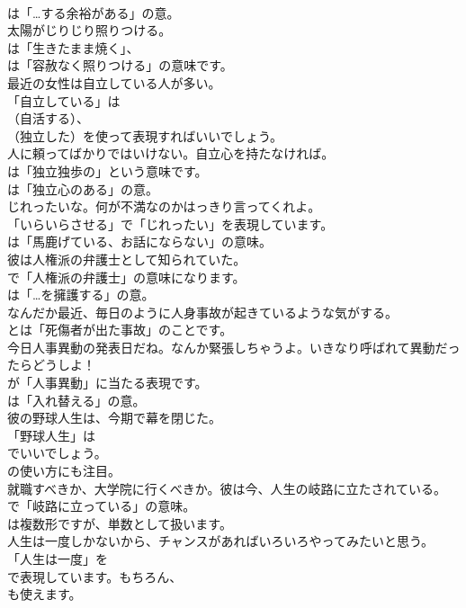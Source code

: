 \documentclass[8pt]{extreport}
\begin{document}
\begin{CJK}{UTF8}{min}
\\	は「…する余裕がある」の意。	
\\	太陽がじりじり照りつける。 
\\	は「生きたまま焼く」、
\\	は「容赦なく照りつける」の意味です。	
\\	最近の女性は自立している人が多い。 
\\	「自立している」は
\\	（自活する）、
\\	（独立した）を使って表現すればいいでしょう。	
\\	人に頼ってばかりではいけない。自立心を持たなければ。 
\\	は「独立独歩の」という意味です。
\\	は「独立心のある」の意。	
\\	じれったいな。何が不満なのかはっきり言ってくれよ。 
\\	「いらいらさせる」で「じれったい」を表現しています。
\\	は「馬鹿げている、お話にならない」の意味。	
\\	彼は人権派の弁護士として知られていた。 
\\	で「人権派の弁護士」の意味になります。
\\	は「…を擁護する」の意。	
\\	なんだか最近、毎日のように人身事故が起きているような気がする。 
\\	とは「死傷者が出た事故」のことです。	
\\	今日人事異動の発表日だね。なんか緊張しちゃうよ。いきなり呼ばれて異動だったらどうしよ！ 
\\	が「人事異動」に当たる表現です。
\\	は「入れ替える」の意。	
\\	彼の野球人生は、今期で幕を閉じた。 
\\	「野球人生」は 
\\	でいいでしょう。
\\	の使い方にも注目。	
\\	就職すべきか、大学院に行くべきか。彼は今、人生の岐路に立たされている。 
\\	で「岐路に立っている」の意味。
\\	は複数形ですが、単数として扱います。	
\\	人生は一度しかないから、チャンスがあればいろいろやってみたいと思う。 
\\	「人生は一度」を
\\	で表現しています。もちろん、
\\	も使えます。	

\end{CJK}
\end{document}
